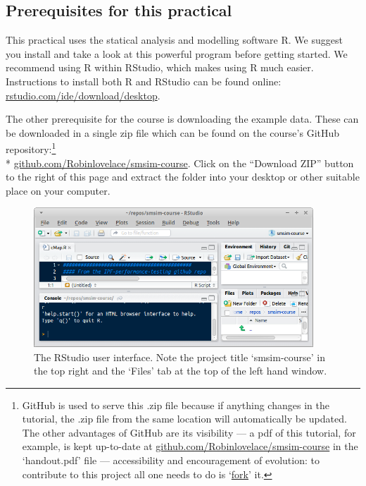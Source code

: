 \documentclass[a4paper, 11pt, twoside]{article}
\begin{document}
\subsection{Prerequisites for this practical}

This practical uses the statical analysis and modelling software
R. We suggest you install and take a look at this powerful program
before getting started. We recommend using R within RStudio, which makes
using R much easier. Instructions to install both R and RStudio can be found
online: \href{http://www.rstudio.com/ide/download/desktop}{rstudio.com/ide/download/desktop}.

The other prerequisite for the course is downloading the example data.
These can be downloaded in a single zip file which can be found on the
course's GitHub repository:\footnote{GitHub
is used to serve this .zip file because if anything changes
in the tutorial, the .zip file from the same location will
automatically be updated. The other advantages of GitHub are its
visibility --- a pdf of this tutorial, for example,
is kept up-to-date at 
\href{https://github.com/Robinlovelace/smsim-course/blob/master/handout.pdf}{github.com/Robinlovelace/smsim-course}
in the `handout.pdf' file --- accessibility and encouragement of evolution: to contribute
to this project all one needs to do is
`\href{https://help.github.com/articles/fork-a-repo}{fork}' it.
} \\*
\href{https://github.com/Robinlovelace/smsim-course}{github.com/Robinlovelace/smsim-course}.
Click on the ``Download ZIP'' button to the right of this page and extract
the folder into your desktop or other suitable place on your computer.

\begin{figure}
\begin{center}
   \includegraphics[width=10.5cm]{rstudio}
\end{center}
 \caption{The RStudio user interface. Note the project title `smsim-course' in
the top right and the `Files' tab at the top of the left hand window.}
\label{frstudio}
\end{figure}
\end{document}
